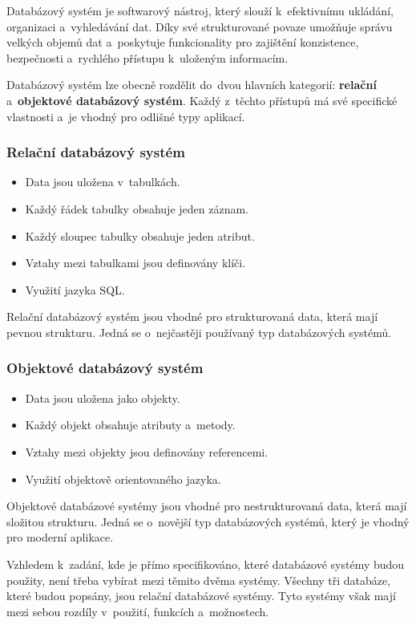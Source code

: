 Databázový systém je softwarový nástroj, který slouží k~efektivnímu ukládání, organizaci a~vyhledávání dat. 
Díky své strukturované povaze umožňuje správu velkých objemů dat a~poskytuje funkcionality pro 
zajištění konzistence, bezpečnosti a~rychlého přístupu k~uloženým informacím.

Databázový systém lze obecně rozdělit do~dvou hlavních kategorií: \textbf{relační} a~\textbf{objektové databázový systém}. 
Každý z~těchto přístupů má své specifické vlastnosti a~je vhodný pro odlišné typy aplikací.

\subsubsection*{Relační databázový systém}
\begin{itemize}[itemsep=-1pt]
    \item Data jsou uložena v~tabulkách.
    \item Každý řádek tabulky obsahuje jeden záznam.
    \item Každý sloupec tabulky obsahuje jeden atribut.
    \item Vztahy mezi tabulkami jsou definovány klíči.
    \item Využití jazyka SQL.
\end{itemize}
Relační databázový systém jsou vhodné pro strukturovaná data, která mají pevnou strukturu.
Jedná se o~nejčastěji používaný typ databázových systémů.

\subsubsection*{Objektové databázový systém}
\begin{itemize}[itemsep=-1pt]
    \item Data jsou uložena jako objekty.
    \item Každý objekt obsahuje atributy a~metody.
    \item Vztahy mezi objekty jsou definovány referencemi.
    \item Využití objektově orientovaného jazyka.
\end{itemize}
Objektové databázové systémy jsou vhodné pro nestrukturovaná data, která mají složitou strukturu.
Jedná se o~novější typ databázových systémů, který je vhodný pro moderní aplikace.

Vzhledem k~zadání, kde je přímo specifikováno, které databázové systémy budou použity,
není třeba vybírat mezi těmito dvěma systémy. Všechny tři databáze, které budou popsány,
jsou relační databázové systémy. Tyto systémy však mají mezi sebou rozdíly v~použití, funkcích a~možnostech.

